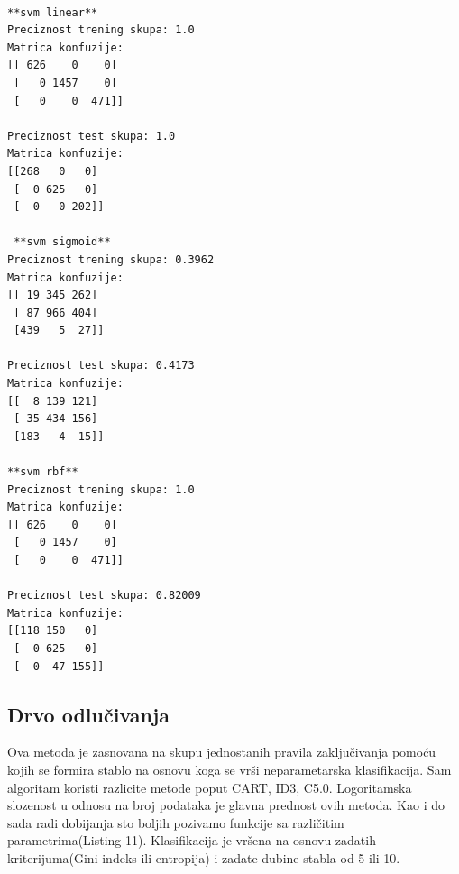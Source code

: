 \documentclass[14pt]{extarticle}
\begin{document}
\begin{lstlisting}[caption={Vizuelizacija},frame=single, label=simple]

**svm linear**
Preciznost trening skupa: 1.0
Matrica konfuzije:
[[ 626    0    0]
 [   0 1457    0]
 [   0    0  471]]
 
Preciznost test skupa: 1.0
Matrica konfuzije:
[[268   0   0]
 [  0 625   0]
 [  0   0 202]]

 **svm sigmoid** 
Preciznost trening skupa: 0.3962
Matrica konfuzije:
[[ 19 345 262]
 [ 87 966 404]
 [439   5  27]]
 
Preciznost test skupa: 0.4173
Matrica konfuzije:
[[  8 139 121]
 [ 35 434 156]
 [183   4  15]]
 
**svm rbf**
Preciznost trening skupa: 1.0
Matrica konfuzije:
[[ 626    0    0]
 [   0 1457    0]
 [   0    0  471]]
 
Preciznost test skupa: 0.82009
Matrica konfuzije:
[[118 150   0]
 [  0 625   0]
 [  0  47 155]]

\end{lstlisting}
\subsection{Drvo odlučivanja}
\label{subsec:podnaslovM}
Ova metoda je zasnovana na skupu jednostanih pravila zaključivanja pomoću kojih se formira stablo na osnovu koga se vrši neparametarska klasifikacija. Sam algoritam koristi razlicite metode poput CART, ID3, C5.0.  Logoritamska slozenost u odnosu na broj podataka je glavna prednost ovih metoda. Kao i do sada radi dobijanja sto boljih pozivamo funkcije sa različitim parametrima(Listing 11). Klasifikacija je vršena na osnovu zadatih kriterijuma(Gini indeks ili entropija) i zadate dubine stabla od 5 ili 10.
\end{document}
